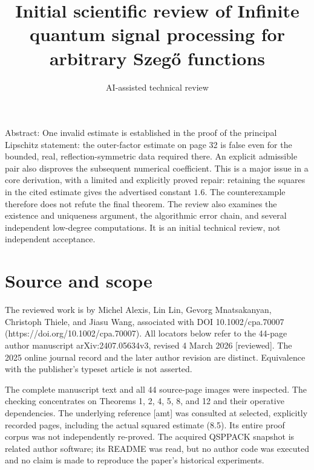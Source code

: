 \documentclass[10pt]{article}
\title{Initial scientific review of
Infinite quantum signal processing
for arbitrary Szegő functions}
\author{AI-assisted technical review}
\date{}
\begin{document}
\maketitle
Abstract: One invalid estimate is established in the proof of the principal Lipschitz statement: the outer-factor estimate on page 32 is false even for the bounded, real, reflection-symmetric data required there. An explicit admissible pair also disproves the subsequent numerical coefficient. This is a major issue in a core derivation, with a limited and explicitly proved repair: retaining the squares in the cited estimate gives the advertised constant \(1.6\). The counterexample therefore does not refute the final theorem. The review also examines the existence and uniqueness argument, the algorithmic error chain, and several independent low-degree computations. It is an initial technical review, not independent acceptance.\par
\section*{Source and scope}
The reviewed work is by Michel Alexis, Lin Lin, Gevorg Mnatsakanyan, Christoph Thiele, and Jiasu Wang, associated with DOI 10.1002/cpa.70007 (https://doi.org/10.1002/cpa.70007). All locators below refer to the 44-page author manuscript arXiv:2407.05634v3, revised 4 March 2026 [reviewed]. The 2025 online journal record and the later author revision are distinct. Equivalence with the publisher’s typeset article is not asserted.\par
The complete manuscript text and all 44 source-page images were inspected. The checking concentrates on Theorems 1, 2, 4, 5, 8, and 12 and their operative dependencies. The underlying reference [amt] was consulted at selected, explicitly recorded pages, including the actual squared estimate (8.5). Its entire proof corpus was not independently re-proved. The acquired QSPPACK snapshot is related author software; its README was read, but no author code was executed and no claim is made to reproduce the paper’s historical experiments.\par
\end{document}
